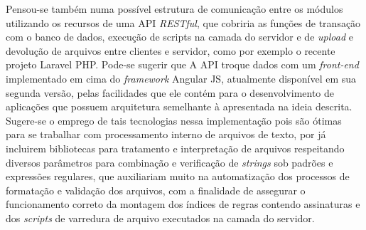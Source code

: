 Pensou-se também numa possível estrutura de comunicação entre os módulos
utilizando os recursos de uma API \textit{RESTful}, que cobriria as funções de
transação com o banco de dados, execução de scripts na camada do servidor e de
\textit{upload} e devolução de arquivos entre clientes e servidor, como por
exemplo o recente projeto Laravel PHP. Pode-se sugerir que A API troque dados
com um \textit{front-end} implementado em cima do \textit{framework} Angular JS,
atualmente disponível em sua segunda versão, pelas facilidades que ele contém
para o desenvolvimento de aplicações que possuem arquitetura semelhante à
apresentada na ideia descrita. Sugere-se o emprego de tais tecnologias nessa
implementação pois são ótimas para se trabalhar com processamento interno de
arquivos de texto, por já incluirem bibliotecas para tratamento e interpretação
de arquivos respeitando diversos parâmetros para combinação e verificação de
\textit{strings} sob padrões e expressões regulares, que auxiliariam muito na
automatização dos processos de formatação e validação dos arquivos, com a
finalidade de assegurar o funcionamento correto da montagem dos índices de
regras contendo assinaturas e dos \textit{scripts} de varredura de arquivo
executados na camada do servidor.

